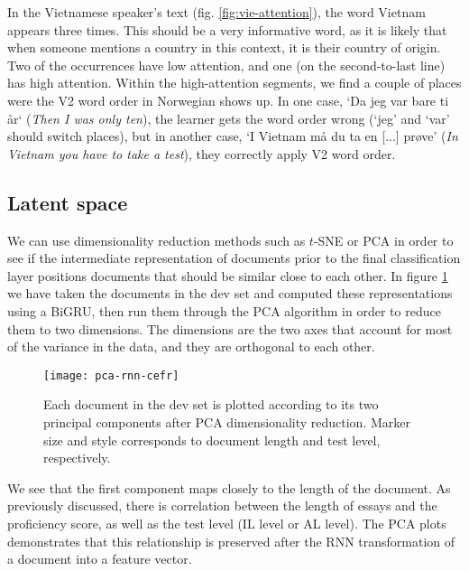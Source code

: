 In the Vietnamese speaker's text (fig. \ref{fig:vie-attention}), the word
Vietnam appears three times. This should be a very informative word, as it is
likely that when someone mentions a country in this context, it is their
country of origin. Two of the occurrences have low attention, and one (on the
second-to-last line) has high attention. Within the high-attention segments, we
find a couple of places were the V2 word order in Norwegian shows up. In one
case, `Da jeg var bare ti år` (\emph{Then I was only ten}), the learner gets
the word order wrong (`jeg' and `var' should switch places), but in another
case, `I Vietnam må du ta en [...] prøve' (\emph{In Vietnam you have to take
a test}), they correctly apply V2 word order.





\subsection{Latent space}

We can use dimensionality reduction methods such as $t$-SNE or \ac{PCA} in
order to see if the intermediate representation of documents prior to the
final classification layer positions documents that should be similar close
to each other. In figure \ref{fig:pca-rnn-cefr} we have taken the documents
in the dev set and computed these representations using a BiGRU, then run
them through the PCA algorithm in order to reduce them to two dimensions. The
dimensions are the two axes that account for most of the variance in the
data, and they are orthogonal to each other.

\begin{figure}
  \centering
  \texttt{[image: pca-rnn-cefr]}
  \caption[PCA plot of the vector representations of documents]{
    Each document in the dev set is plotted according to its two principal
    components after PCA dimensionality reduction. Marker size and style
    corresponds to document length and test level, respectively.
  }
  \label{fig:pca-rnn-cefr}
\end{figure}

We see that the first component maps closely to the length of the document.
As previously discussed, there is correlation between the length of essays
and the proficiency score, as well as the test level (IL level or AL level).
The PCA plots demonstrates that this relationship is preserved after the RNN
transformation of a document into a feature vector.
